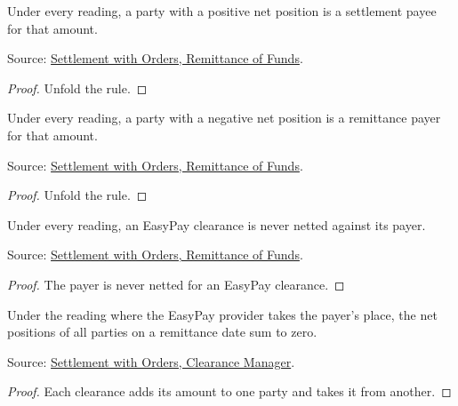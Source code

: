\begin{theorem}
  \label{thm:accounting-settlement-payee}
  Under every reading, a party with a positive net position is a
  settlement payee for that amount.

  Source: \href{https://standards.atlassian.net/wiki/spaces/SWO/pages/574718145}{Settlement with Orders, Remittance of Funds}.
\end{theorem}
\begin{proof}
  Unfold the rule.
\end{proof}

\begin{theorem}
  \label{thm:accounting-remittance-payer}
  Under every reading, a party with a negative net position is a
  remittance payer for that amount.

  Source: \href{https://standards.atlassian.net/wiki/spaces/SWO/pages/574718145}{Settlement with Orders, Remittance of Funds}.
\end{theorem}
\begin{proof}
  Unfold the rule.
\end{proof}

\begin{theorem}
  \label{thm:accounting-easypay-out}
  Under every reading, an EasyPay clearance is never netted against its
  payer.

  Source: \href{https://standards.atlassian.net/wiki/spaces/SWO/pages/574718145}{Settlement with Orders, Remittance of Funds}.
\end{theorem}
\begin{proof}
  The payer is never netted for an EasyPay clearance.
\end{proof}

\begin{theorem}
  \label{thm:accounting-net-zero-provider}
  Under the reading where the EasyPay provider takes the payer's place,
  the net positions of all parties on a remittance date sum to zero.

  Source: \href{https://standards.atlassian.net/wiki/spaces/SWO/pages/574259794}{Settlement with Orders, Clearance Manager}.
\end{theorem}
\begin{proof}
  Each clearance adds its amount to one party and takes it from another.
\end{proof}

